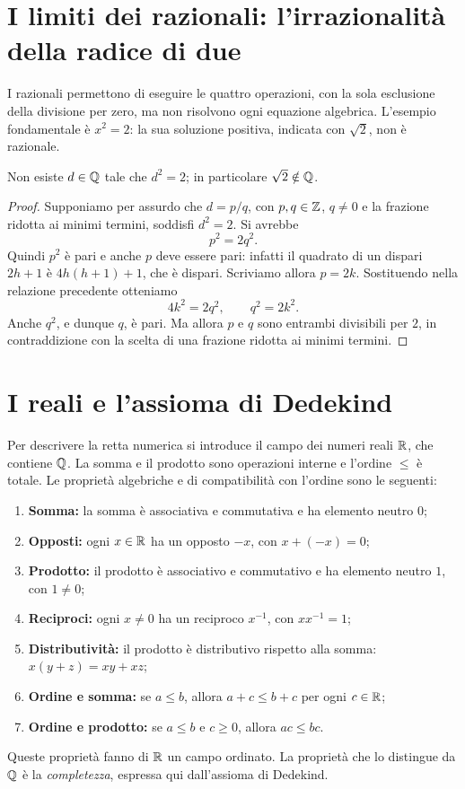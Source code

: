 \section{I limiti dei razionali: l'irrazionalità della radice di due}

I razionali permettono di eseguire le quattro operazioni, con la sola esclusione della divisione per zero, ma non risolvono ogni equazione algebrica. L'esempio fondamentale è $x^2=2$: la sua soluzione positiva, indicata con $\sqrt2$, non è razionale.

\begin{proposizione}
Non esiste $d\in\mathbb{Q}$ tale che $d^2=2$; in particolare $\sqrt2\notin\mathbb{Q}$.
\end{proposizione}
\begin{proof}
Supponiamo per assurdo che $d=p/q$, con $p,q\in\mathbb{Z}$, $q\ne0$ e la frazione ridotta ai minimi termini, soddisfi $d^2=2$. Si avrebbe
\[
  p^2=2q^2.
\]
Quindi $p^2$ è pari e anche $p$ deve essere pari: infatti il quadrato di un dispari $2h+1$ è $4h(h+1)+1$, che è dispari. Scriviamo allora $p=2k$. Sostituendo nella relazione precedente otteniamo
\[
  4k^2=2q^2,\qquad q^2=2k^2.
\]
Anche $q^2$, e dunque $q$, è pari. Ma allora $p$ e $q$ sono entrambi divisibili per $2$, in contraddizione con la scelta di una frazione ridotta ai minimi termini.
\end{proof}

\section{I reali e l'assioma di Dedekind}

Per descrivere la retta numerica si introduce il campo dei numeri reali $\mathbb{R}$, che contiene $\mathbb{Q}$. La somma e il prodotto sono operazioni interne e l'ordine $\le$ è totale. Le proprietà algebriche e di compatibilità con l'ordine sono le seguenti:
\begin{enumerate}[label=(\alph*)]
  \item \textbf{Somma:} la somma è associativa e commutativa e ha elemento neutro $0$;
  \item \textbf{Opposti:} ogni $x\in\mathbb{R}$ ha un opposto $-x$, con $x+(-x)=0$;
  \item \textbf{Prodotto:} il prodotto è associativo e commutativo e ha elemento neutro $1$, con $1\ne0$;
  \item \textbf{Reciproci:} ogni $x\ne0$ ha un reciproco $x^{-1}$, con $xx^{-1}=1$;
  \item \textbf{Distributività:} il prodotto è distributivo rispetto alla somma: $x(y+z)=xy+xz$;
  \item \textbf{Ordine e somma:} se $a\le b$, allora $a+c\le b+c$ per ogni $c\in\mathbb{R}$;
  \item \textbf{Ordine e prodotto:} se $a\le b$ e $c\ge0$, allora $ac\le bc$.
\end{enumerate}
Queste proprietà fanno di $\mathbb{R}$ un campo ordinato. La proprietà che lo distingue da $\mathbb{Q}$ è la \emph{completezza}, espressa qui dall'assioma di Dedekind.

